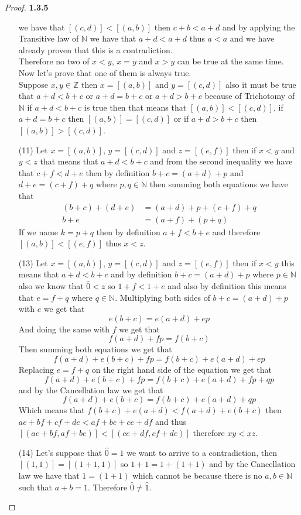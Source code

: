 \documentclass[11pt]{article}
\newcommand{\N}{\mathbb{N}}
\newcommand{\Z}{\mathbb{Z}}
\theoremstyle{definition}
\begin{document}
\begin{proof}{\textbf{1.3.5}}
\begin{itemize}
    we have that $[(c,d)]<[(a,b)]$ then $c+b<a+d$ and by applying the Transitive law of
    $\N$ we have that $a+d<a+d$ thus $a<a$ and we have already proven that this is a
    contradiction.\\
    Therefore no two of $x<y$, $x=y$ and $x>y$ can be true at the same time.\\
    Now let's prove that one of them is always true. \\
    Suppose $x,y \in \Z$ then $x=[(a,b)]$ and $y=[(c,d)]$ also it must be true that
    $a+d<b+c$ or $a+d=b+c$ or $a+d>b+c$ because of Trichotomy of $\N$ if $a+d<b+c$ is
    true then that means that $[(a,b)]<[(c,d)]$, if $a+d=b+c$ then $[(a,b)]=[(c,d)]$ or
    if $a+d>b+c$ then $[(a,b)]>[(c,d)]$.
    \item [(11)]
    Let $x=[(a,b)]$, $y=[(c,d)]$ and $z=[(e,f)]$ then if $x<y$ and $y<z$ that means 
    that $a+d<b+c$ and from the second inequality we have that $c+f<d+e$ then
    by definition $b+c = (a+d) + p$ and $d+e = (c+f)+q$ where $p,q \in \N$ then summing
    both equations we have that
    \begin{align*}
        (b+c)+(d+e) &= (a+d)+p+(c+f)+q \\
        b+e &= (a+f)+(p+q)
    \end{align*}
    If we name $k=p+q$ then by definition $a+f<b+e$ and therefore $[(a,b)]<[(e,f)]$ thus
    $x<z$.
    \item [(13)]
    Let $x=[(a,b)]$, $y=[(c,d)]$ and $z=[(e,f)]$ then if $x<y$ this means that $a+d<b+c$
    and by definition $b+c=(a+d)+p$ where $p\in\N$ also we know that $\hat{0}<z$ so
    $1+f<1+e$ and also by definition this means that $e = f + q$ where $q \in \N$.
    Multiplying both sides of $b+c=(a+d)+p$ with $e$ we get that
    $$e(b+c)=e(a+d)+ep$$
    And doing the same with $f$ we get that
    $$f(a+d)+fp=f(b+c)$$
    Then summing both equations we get that
    $$f(a+d)+e(b+c)+fp=f(b+c)+e(a+d)+ep$$
    Replacing $e=f+q$ on the right hand side of the equation we get that
    $$f(a+d)+e(b+c)+fp=f(b+c)+e(a+d)+fp+qp$$
    and by the Cancellation law we get that
    $$f(a+d)+e(b+c)=f(b+c)+e(a+d)+qp$$
    Which means that $f(b+c)+e(a+d)<f(a+d)+e(b+c)$ then $ae+bf+cf+de<af+be+ce+df$
    and thus $[(ae+bf,af+be)]<[(ce+df,cf+de)]$ therefore $xy<xz$.
    \item [(14)]
    Let's suppose that $\hat{0}=\hat{1}$ we want to arrive to a contradiction, then
    $[(1,1)]=[(1+1,1)]$ so $1+1=1+(1+1)$ and by the Cancellation law we have that
    $1=(1+1)$ which cannot be because there is no $a,b\in\N$ such that $a+b=1$.
    Therefore $\hat{0}\neq\hat{1}$.
    \end{itemize}
    \end{proof}
\end{document}
